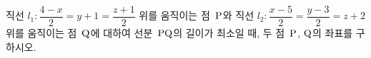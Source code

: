 직선 $l_1\colon \dfrac{4-x}{2}=y+1=\dfrac{z+1}{2}$ 위를 움직이는 점~$\mathrm{P}$와 직선 $l_2\colon \dfrac{x-5}{2}=\dfrac{y-3}{2}=z+2$ 위를 움직이는 점~$\mathrm{Q}$에 대하여 선분~$\mathrm{PQ}$의 길이가 최소일 때, 두 점~$\mathrm{P}$, $\mathrm{Q}$의 좌표를 구하시오.
